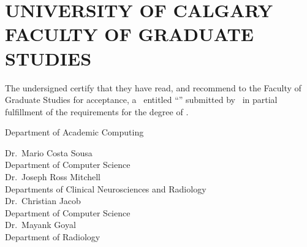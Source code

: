 \makethesistitle
{}     %
\setcounter{page}{1}
\chapter*{UNIVERSITY OF CALGARY \\ FACULTY OF GRADUATE STUDIES}
\thispagestyle{empty}
The undersigned certify that they have read, and recommend
to the Faculty of Graduate Studies for acceptance, a \Thesis\ entitled
``\thesistitle'' submitted by \Author\
in partial fulfillment of the requirements for the degree of \Degree.\\




%
%
\begin{signing}{Department of Academic Computing}






\newsigncolumn
\signline
Dr.~Mario Costa Sousa \\
Department of Computer Science \\
\signline
Dr.~Joseph Ross Mitchell \\
Departments of Clinical Neurosciences and Radiology \\
\signline
Dr.~Christian Jacob \\
Department of Computer Science \\
\signline
Dr.~Mayank Goyal \\
Department of Radiology \\
\end{signing}
